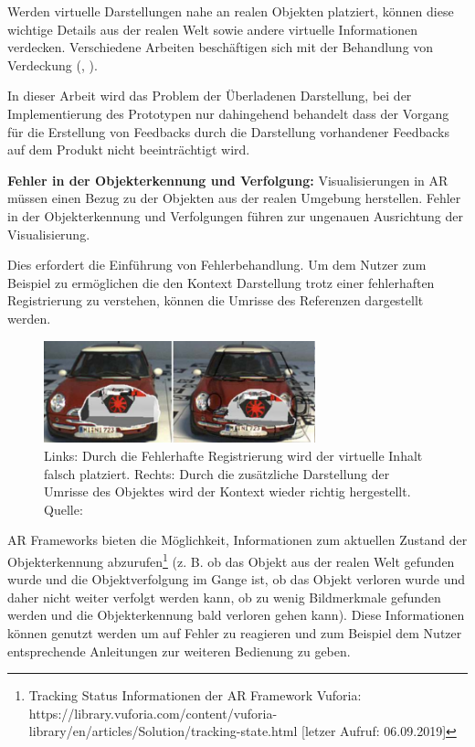 Werden virtuelle Darstellungen nahe an realen Objekten platziert, können diese wichtige Details aus der realen Welt sowie andere virtuelle Informationen verdecken. 
Verschiedene Arbeiten beschäftigen sich mit der Behandlung von Verdeckung (\cite{Grasset2012}, \cite{Bell2001}).

In dieser Arbeit wird das Problem der Überladenen Darstellung, bei der Implementierung des Prototypen nur dahingehend behandelt dass der Vorgang für die Erstellung von 
Feedbacks durch die Darstellung vorhandener Feedbacks auf dem Produkt nicht beeinträchtigt wird. 

\textbf{Fehler in der Objekterkennung und Verfolgung:} Visualisierungen in AR müssen einen Bezug zu der Objekten aus der realen Umgebung herstellen. Fehler
in der Objekterkennung und Verfolgungen führen zur ungenauen Ausrichtung der Visualisierung.%

Dies erfordert die Einführung von Fehlerbehandlung. Um dem Nutzer zum Beispiel zu ermöglichen die den Kontext Darstellung trotz einer fehlerhaften 
Registrierung zu verstehen, können die Umrisse des Referenzen dargestellt werden. \cite[S.~243]{DieterSchmalstieg2016}

\begin{figure}[H]
	\centering
	\includegraphics[width=0.7\textwidth]{resources/fundamentals/missallignement.png}
	\caption{Links: Durch die Fehlerhafte Registrierung wird der virtuelle Inhalt falsch platziert. Rechts: Durch die zusätzliche Darstellung der Umrisse des Objektes wird der Kontext wieder richtig hergestellt. Quelle: \cite[S.~243]{DieterSchmalstieg2016}}
	\label{img:missallignement}
\end{figure}

AR Frameworks bieten die Möglichkeit, Informationen zum aktuellen Zustand der Objekterkennung abzurufen\footnote{Tracking Status Informationen der AR Framework Vuforia: https://library.vuforia.com/content/vuforia-library/en/articles/Solution/tracking-state.html [letzer Aufruf: 06.09.2019]} (z. B. ob das Objekt aus der realen Welt gefunden wurde und die Objektverfolgung im Gange ist, ob das Objekt verloren wurde und daher nicht weiter verfolgt werden kann, ob zu wenig Bildmerkmale gefunden werden und die Objekterkennung bald verloren gehen kann). 
Diese Informationen können genutzt werden um auf Fehler zu reagieren und zum Beispiel dem Nutzer entsprechende Anleitungen zur weiteren Bedienung zu geben.

